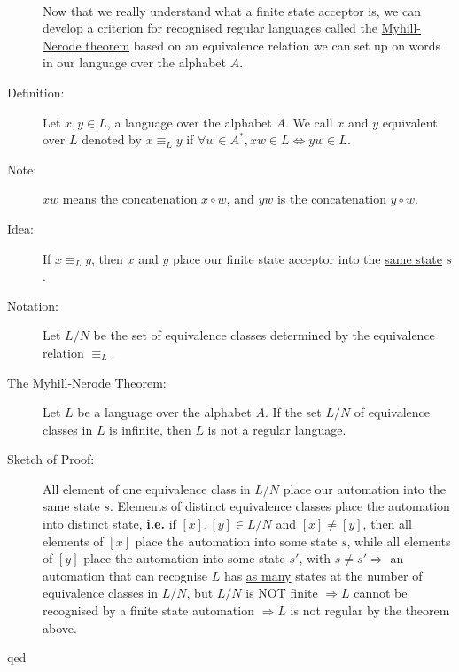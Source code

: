 \documentclass[10pt]{article}
\begin{document}
\begin{description}
\begin{table}[h!]
		\end{table}
		~\\
		Now that we really understand what a finite state acceptor is, we can develop a criterion for recognised regular languages called the \underline{Myhill-Nerode theorem} based on an equivalence relation we can set up on words in our language over the alphabet $A$.
		\item[Definition:] Let $x, y \in L$, a language over the alphabet $A$. We call $x$ and $y$ equivalent over $L$ denoted by $x \equiv_L y$ if $\forall w \in A^*, xw \in L \Leftrightarrow yw \in L$.
		\item[Note:] $xw$ means the concatenation $x \circ w$, and $yw$ is the concatenation $y \circ w$.
		\item[Idea:] If $x \equiv_L y$, then $x$ and $y$ place our finite state acceptor into the \underline{same state} $s$.
		\item[Notation:] Let $L/N$ be the set of equivalence classes determined by the equivalence relation $\equiv_L$.
		\item[The Myhill-Nerode Theorem:] Let $L$ be a language over the alphabet $A$. If the set $L/N$ of equivalence classes in $L$ is infinite, then $L$ is not a regular language.
		\item[Sketch of Proof:] All element of one equivalence class in $L/N$ place our automation into the same state $s$. Elements of distinct equivalence classes place the automation into distinct state, \textbf{i.e.} if $[x], [y] \in L/N$ and $[x] \neq [y]$, then all elements of $[x]$ place the automation into some state $s$, while all elements of $[y]$ place the automation into some state $s'$, with $s \neq s' \Rightarrow$ an automation that can recognise $L$ has \underline{as many} states at the number of equivalence classes in $L/N$, but $L/N$ is \underline{NOT} finite $\Rightarrow L$ cannot be recognised by a finite state automation $\Rightarrow L$ is not regular by the theorem above.
		\item[qed]
	\end{description}
	
\end{document}
